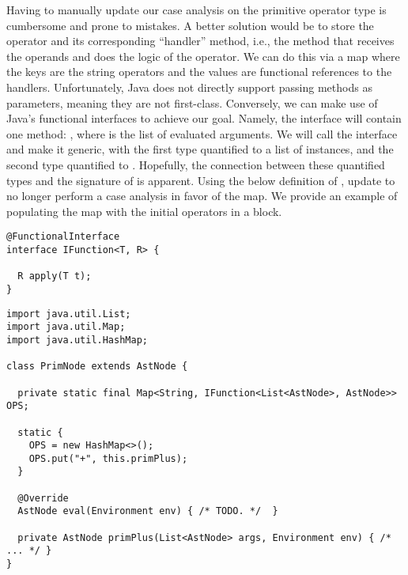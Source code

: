  Having to manually update our case analysis on the primitive operator type is cumbersome and prone to mistakes. A better solution would be to store the operator and its corresponding ``handler'' method, i.e., the method that receives the operands and does the logic of the operator. We can do this via a map where the keys are the string operators and the values are functional references to the handlers. Unfortunately, Java does not directly support passing methods as parameters, meaning they are not first-class. Conversely, we can make use of Java's functional interfaces to achieve our goal. Namely, the interface will contain one method: , where  is the list of evaluated arguments. We will call the interface  and make it generic, with the first type quantified to a list of  instances, and the second type quantified to . Hopefully, the connection between these quantified types and the signature of  is apparent. Using the below definition of , update  to no longer perform a case analysis in favor of the map. We provide an example of populating the map with the initial operators in a  block.

\begin{lstlisting}[language=MyJava]
@FunctionalInterface
interface IFunction<T, R> {
  
  R apply(T t);
}
\end{lstlisting}

\enlargethispage{1\baselineskip}
\begin{lstlisting}[language=MyJava]
import java.util.List;
import java.util.Map;
import java.util.HashMap;

class PrimNode extends AstNode {
  
  private static final Map<String, IFunction<List<AstNode>, AstNode>> OPS;
  
  static {
    OPS = new HashMap<>();
    OPS.put("+", this.primPlus);
  }

  @Override
  AstNode eval(Environment env) { /* TODO. */  }

  private AstNode primPlus(List<AstNode> args, Environment env) { /* ... */ }
}
\end{lstlisting}

